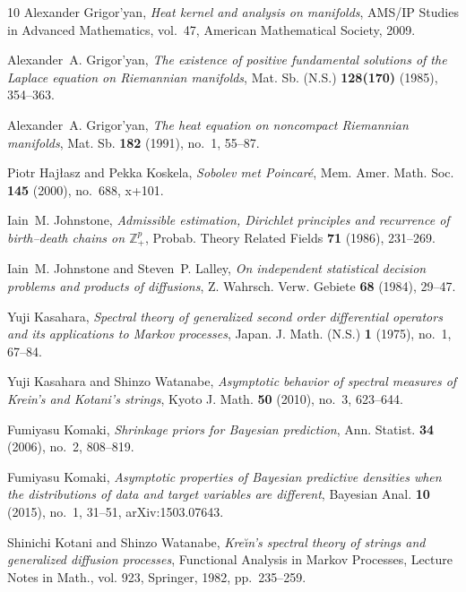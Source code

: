 \documentclass[11pt]{amsart}
\theoremstyle{plain}
\theoremstyle{definition}
\theoremstyle{remark}
\begin{document}
{\begin{thebibliography}{10}
Alexander Grigor'yan, \emph{Heat kernel and analysis on manifolds}, AMS/IP
  Studies in Advanced Mathematics, vol.~47, American Mathematical Society, 2009.

Alexander~A. Grigor'yan, \emph{The existence of positive fundamental solutions
  of the {L}aplace equation on {R}iemannian manifolds}, Mat. Sb. (N.S.)
  \textbf{128(170)} (1985), 354--363.

Alexander~A. Grigor'yan, \emph{The heat equation on noncompact {R}iemannian
  manifolds}, Mat. Sb. \textbf{182} (1991), no.~1, 55--87.

Piotr Haj{\l}asz and Pekka Koskela, \emph{Sobolev met {P}oincar\'e}, Mem. Amer.
  Math. Soc. \textbf{145} (2000), no.~688, x+101.

Iain~M. Johnstone, \emph{Admissible estimation, {D}irichlet principles and
  recurrence of birth--death chains on {$\mathbb{Z}^p_+$}}, Probab. Theory
  Related Fields \textbf{71} (1986), 231--269.

Iain~M. Johnstone and Steven~P. Lalley, \emph{On independent statistical
  decision problems and products of diffusions}, Z. Wahrsch. Verw. Gebiete
  \textbf{68} (1984), 29--47.

Yuji Kasahara, \emph{Spectral theory of generalized second order differential
  operators and its applications to {M}arkov processes}, Japan. J. Math. (N.S.)
  \textbf{1} (1975), no.~1, 67--84.

Yuji Kasahara and Shinzo Watanabe, \emph{Asymptotic behavior of spectral
  measures of {K}rein's and {K}otani's strings}, Kyoto J. Math. \textbf{50}
  (2010), no.~3, 623--644.

Fumiyasu Komaki, \emph{Shrinkage priors for {B}ayesian prediction}, Ann.
  Statist. \textbf{34} (2006), no.~2, 808--819.

Fumiyasu Komaki, \emph{Asymptotic properties of {B}ayesian predictive densities
  when the distributions of data and target variables are different}, Bayesian
  Anal. \textbf{10} (2015), no.~1, 31--51, arXiv:1503.07643.

Shinichi Kotani and Shinzo Watanabe, \emph{Kre{\u\i}n's spectral theory of
  strings and generalized diffusion processes}, Functional Analysis in Markov
  Processes, Lecture Notes in Math., vol. 923, Springer, 1982, pp.~235--259.


\end{thebibliography}}
\end{document}

